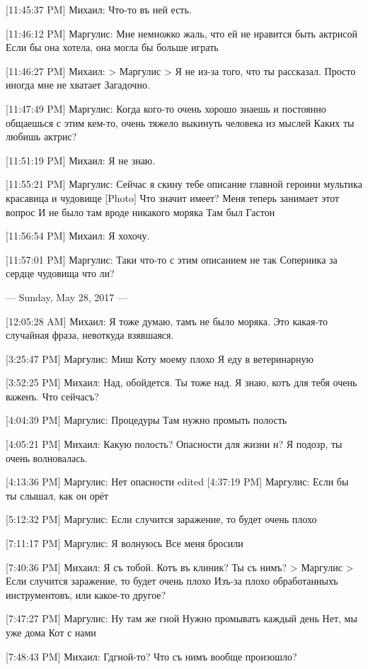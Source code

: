 \documentclass{article}
\newcommand{\yat}{{\fontencoding{X2}\selectfont\cyryat}} %
\begin{document}
{[11:45:37 PM] Михаил:
Что-то въ ней есть.

[11:46:12 PM] Маргулис:
Мне немножко жаль, что ей не нравится быть актрисой
 Если бы она хотела, она могла бы больше играть

[11:46:27 PM] Михаил:
> Маргулис
> Я не из-за того, что ты рассказал. Просто иногда мне не хватает
Загадочно.

[11:47:49 PM] Маргулис:
Когда кого-то очень хорошо знаешь и постоянно общаешься с этим кем-то, очень тяжело выкинуть человека из мыслей
 Каких ты любишь актрис?

[11:51:19 PM] Михаил:
Я не знаю.

[11:55:21 PM] Маргулис:
Сейчас я скину тебе описание главной героини мультика красавица и чудовище
 [Photo]
 Что значит имеет?
 Меня теперь занимает этот вопрос
 И не было там вроде никакого моряка
 Там был Гастон

[11:56:54 PM] Михаил:
Я хохочу.

[11:57:01 PM] Маргулис:
Таки что-то с этим описанием не так
 Соперника за сердце чудовища что ли?

--- Sunday, May 28, 2017 ---

[12:05:28 AM] Михаил:
Я тоже думаю, тамъ не было моряка. Это какая-то случайная фраза, нев откуда взявшаяся.

[3:25:47 PM] Маргулис:
Миш
 Коту моему плохо
 Я еду в ветеринарную

[3:52:25 PM] Михаил:
Над, обойдется.
 Ты тоже над. Я знаю, котъ для тебя очень важенъ.
 Что сейчасъ?

[4:04:39 PM] Маргулис:
Процедуры
 Там нужно промыть полость

[4:05:21 PM] Михаил:
Какую полость?
 Опасности для жизни н?
 Я подозр, ты очень волновалась.

[4:13:36 PM] Маргулис:
Нет опасности
edited 
[4:37:19 PM] Маргулис:
Если бы ты слышал, как он орёт

[5:12:32 PM] Маргулис:
Если случится заражение, то будет очень плохо

[7:11:17 PM] Маргулис:
Я волнуюсь
 Все меня бросили

[7:40:36 PM] Михаил:
Я съ тобой.
 Котъ въ клиник\yat? Ты съ нимъ?
> Маргулис
> Если случится заражение, то будет очень плохо
Изъ-за плохо обработанныхъ инструментовъ, или какое-то другое?

[7:47:27 PM] Маргулис:
Ну там же гной
 Нужно промывать каждый день
 Нет, мы уже дома
 Кот с нами

[7:48:43 PM] Михаил:
Гд\yat гной-то? Что съ нимъ вообще произошло?

}
\end{document}
